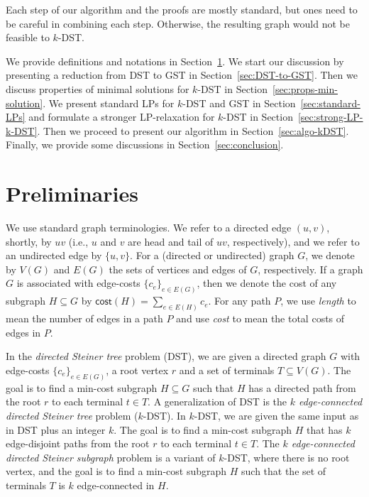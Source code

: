 \documentclass[11pt]{article}
\theoremstyle{definition}
\theoremstyle{remark}
\newcommand{\cost}{\mathsf{cost}}
\begin{document}
Each step of our algorithm and the proofs are mostly standard,
but ones need to be careful in combining each step.
Otherwise, the resulting graph would not be feasible to $k$-DST.

\medskip{}
We provide definitions and notations in Section~\ref{sec:prelim}. 
We start our discussion by presenting a reduction from DST to GST
in Section~\ref{sec:DST-to-GST}.
Then we discuss properties of minimal solutions for $k$-DST
in Section~\ref{sec:props-min-solution}.
We present standard LPs for $k$-DST and GST in
Section~\ref{sec:standard-LPs}
and formulate a stronger LP-relaxation for $k$-DST in
Section~\ref{sec:strong-LP-k-DST}.
Then we proceed to present our algorithm in
Section~\ref{sec:algo-kDST}. 
Finally, we provide some discussions in Section~\ref{sec:conclusion}.

\section{Preliminaries}
\label{sec:prelim}

We use standard graph terminologies. 
We refer to a directed edge $(u,v)$, shortly, by $uv$
(i.e., $u$ and $v$ are head and tail of $uv$, respectively),
and we refer to an undirected edge by $\{u,v\}$.
For a (directed or undirected) graph $G$, we denote by $V(G)$ and $E(G)$
the sets of vertices and edges of $G$, respectively.
If a graph $G$ is associated with edge-costs $\{c_e\}_{e\in E(G)}$, 
then we denote the cost of any subgraph $H\subseteq G$ by
$\cost(H) = \sum_{e\in E(H)}c_e$.
For any path $P$, 
we use {\em length} to mean the number of edges in a path $P$ and
use {\em cost} to mean the total costs of edges in $P$.


In the {\em directed Steiner tree} problem (DST), 
we are given a directed graph $G$ with edge-costs $\{c_e\}_{e\in E(G)}$, 
a root vertex $r$ and a set of terminals $T\subseteq V(G)$.
The goal is to find a min-cost subgraph $H\subseteq G$ such that
$H$ has a directed path from the root $r$ to each terminal $t\in T$.
A generalization of DST is the 
{\em $k$ edge-connected directed Steiner tree} problem ($k$-DST).
In $k$-DST, we are given the same input as in DST plus an integer $k$. 
The goal is to find a min-cost subgraph $H$ that has $k$ edge-disjoint
paths from the root $r$ to each terminal $t\in T$.
The {\em $k$ edge-connected directed Steiner subgraph} problem
is a variant of $k$-DST, where there is no root vertex, and
the goal is to find a min-cost subgraph $H$ such that
the set of terminals $T$ is $k$ edge-connected in $H$. 
\end{document}
